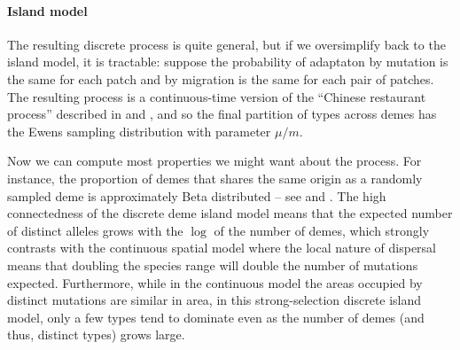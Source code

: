 \documentclass{article}
\begin{document}
\paragraph{Island model}
The resulting discrete process is quite general,
but if we oversimplify back to the island model, it is tractable:
suppose the probability of adaptaton by mutation is the same for each patch
and by migration is the same for each pair of patches.
The resulting process is a continuous-time version of the ``Chinese restaurant process''
described in \citet{aldous1985exchangeability} and \citet{pitman1995partitions},
and so the final partition of types across demes has the Ewens sampling distribution with parameter $\mu/m$.

Now we can compute most properties we might want about the process.
For instance, the proportion of demes that shares the same origin as a randomly sampled deme
is approximately Beta distributed -- see \cite{donnelly1989continuity} and \cite{perman1992sizebiased}.
The high connectedness of the discrete deme island model means that the expected number of distinct alleles
grows with the $\log$ of the number of demes, 
which strongly contrasts with the continuous spatial model 
where the local nature of dispersal means that doubling the species range will double the number of mutations expected. 
Furthermore, while in the continuous model the areas occupied by distinct mutations are similar in area, 
in this strong-selection discrete island model, 
only a few types tend to dominate even as the number of demes (and thus, distinct types) grows large.
\end{document}
